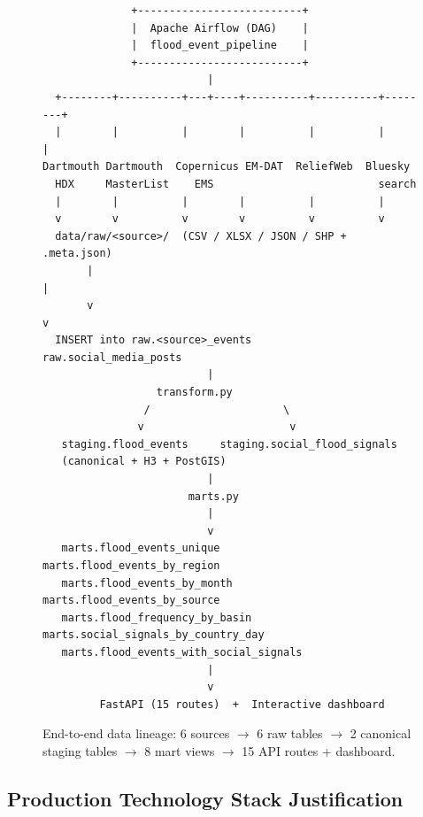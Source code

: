 \documentclass[11pt,a4paper]{article}
\begin{document}
\begin{figure}[h!]
\centering
\begin{verbatim}
              +--------------------------+
              |  Apache Airflow (DAG)    |
              |  flood_event_pipeline    |
              +--------------------------+
                          |
  +--------+----------+---+----+----------+----------+--------+
  |        |          |        |          |          |        |
Dartmouth Dartmouth  Copernicus EM-DAT  ReliefWeb  Bluesky
  HDX     MasterList    EMS                          search
  |        |          |        |          |          |
  v        v          v        v          v          v
  data/raw/<source>/  (CSV / XLSX / JSON / SHP + .meta.json)
       |                                                    |
       v                                                    v
  INSERT into raw.<source>_events           raw.social_media_posts
                          |
                  transform.py
                /                     \
               v                       v
   staging.flood_events     staging.social_flood_signals
   (canonical + H3 + PostGIS)
                          |
                       marts.py
                          |
                          v
   marts.flood_events_unique          marts.flood_events_by_region
   marts.flood_events_by_month        marts.flood_events_by_source
   marts.flood_frequency_by_basin     marts.social_signals_by_country_day
   marts.flood_events_with_social_signals
                          |
                          v
         FastAPI (15 routes)  +  Interactive dashboard
\end{verbatim}
\caption{End-to-end data lineage: 6 sources $\to$ 6 raw tables $\to$ 2
canonical staging tables $\to$ 8 mart views $\to$ 15 API routes + dashboard.}
\label{fig:arch}
\end{figure}

\subsection{Production Technology Stack Justification}
\end{document}
